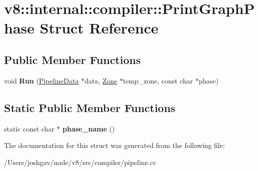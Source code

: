 \hypertarget{structv8_1_1internal_1_1compiler_1_1_print_graph_phase}{}\section{v8\+:\+:internal\+:\+:compiler\+:\+:Print\+Graph\+Phase Struct Reference}
\label{structv8_1_1internal_1_1compiler_1_1_print_graph_phase}
\subsection*{Public Member Functions}
\begin{DoxyCompactItemize}
\item 
void {\bfseries Run} (\hyperlink{classv8_1_1internal_1_1compiler_1_1_pipeline_data}{Pipeline\+Data} $\ast$data, \hyperlink{classv8_1_1internal_1_1_zone}{Zone} $\ast$temp\+\_\+zone, const char $\ast$phase)\hypertarget{structv8_1_1internal_1_1compiler_1_1_print_graph_phase_a803d65cc7e2ba51215800a93c6a0046d}{}\label{structv8_1_1internal_1_1compiler_1_1_print_graph_phase_a803d65cc7e2ba51215800a93c6a0046d}

\end{DoxyCompactItemize}
\subsection*{Static Public Member Functions}
\begin{DoxyCompactItemize}
\item 
static const char $\ast$ {\bfseries phase\+\_\+name} ()\hypertarget{structv8_1_1internal_1_1compiler_1_1_print_graph_phase_a398c629fda17ef06ad6d1d49c58ba70b}{}\label{structv8_1_1internal_1_1compiler_1_1_print_graph_phase_a398c629fda17ef06ad6d1d49c58ba70b}

\end{DoxyCompactItemize}


The documentation for this struct was generated from the following file\+:\begin{DoxyCompactItemize}
\item 
/\+Users/joshgav/node/v8/src/compiler/pipeline.\+cc\end{DoxyCompactItemize}
